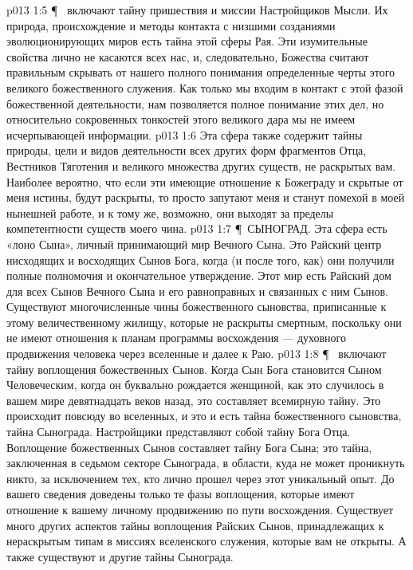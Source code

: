 \vs p013 1:5 \P\  включают тайну пришествия и миссии Настройщиков Мысли. Их природа, происхождение и методы контакта с низшими созданиями эволюционирующих миров есть тайна этой сферы Рая. Эти изумительные свойства лично не касаются всех нас, и, следовательно, Божества считают правильным скрывать от нашего полного понимания определенные черты этого великого божественного служения. Как только мы входим в контакт с этой фазой божественной деятельности, нам позволяется полное понимание этих дел, но относительно сокровенных тонкостей этого великого дара мы не имеем исчерпывающей информации.
\vs p013 1:6 Эта сфера также содержит тайны природы, цели и видов деятельности всех других форм фрагментов Отца, Вестников Тяготения и великого множества других существ, не раскрытых вам. Наиболее вероятно, что если эти имеющие отношение к Божеграду и скрытые от меня истины, будут раскрыты, то просто запутают меня и станут помехой в моей нынешней работе, и к тому же, возможно, они выходят за пределы компетентности существ моего чина.
\vs p013 1:7 \P\ \bibnobreakspace СЫНОГРАД. Эта сфера есть «лоно Сына», личный принимающий мир Вечного Сына. Это Райский центр нисходящих и восходящих Сынов Бога, когда (и после того, как) они получили полные полномочия и окончательное утверждение. Этот мир есть Райский дом для всех Сынов Вечного Сына и его равноправных и связанных с ним Сынов. Существуют многочисленные чины божественного сыновства, приписанные к этому величественному жилищу, которые не раскрыты смертным, поскольку они не имеют отношения к планам программы восхождения --- духовного продвижения человека через вселенные и далее к Раю.
\vs p013 1:8 \P\  включают тайну воплощения божественных Сынов. Когда Сын Бога становится Сыном Человеческим, когда он буквально рождается женщиной, как это случилось в вашем мире девятнадцать веков назад, это составляет всемирную тайну. Это происходит повсюду во вселенных, и это и есть тайна божественного сыновства, тайна Сынограда. Настройщики представляют собой тайну Бога Отца. Воплощение божественных Сынов составляет тайну Бога Сына; это тайна, заключенная в седьмом секторе Сынограда, в области, куда не может проникнуть никто, за исключением тех, кто лично прошел через этот уникальный опыт. До вашего сведения доведены только те фазы воплощения, которые имеют отношение к вашему личному продвижению по пути восхождения. Существует много других аспектов тайны воплощения Райских Сынов, принадлежащих к нераскрытым типам в миссиях вселенского служения, которые вам не открыты. А также существуют и другие тайны Сынограда.
